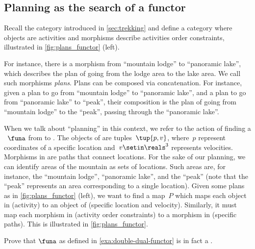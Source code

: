 \subsection{Planning as the search of a functor}

\begin{example}
    \label{ex:planning-as-search-functor}
    Recall the category \Berg introduced in \cref{sec:trekking} and define a category \Plans where objects are activities and morphisms describe activities order constraints, illustrated in \cref{fig:plans_functor} (left).

    For instance, there is a morphism from ``mountain lodge'' to ``panoramic lake'', which describes the plan of going from the lodge area to the lake area.
    We call such morphisms \emph{plans}.
    Plans can be composed via concatenation.
    For instance, given a plan to go from ``mountain lodge'' to ``panoramic lake'', and a plan to go from ``panoramic lake'' to ``peak'', their composition is the plan of going from ``mountain lodge'' to the ``peak'', passing through the ``panoramic lake''.

    When we talk about ``planning'' in this context, we refer to the action of finding a ~$\funa$ from \Plans to \Berg.
    The objects of \Berg are tuples~$\tup{p,v}$, where~$p$ represent coordinates of a specific location and~$v\setin \reals^3$ represents velocities.
    Morphisms in \Berg are paths that connect locations.
    For the sake of our planning, we can identify areas of the mountain as sets of locations.
    Such areas are, for instance, the ``mountain lodge'', ``panoramic lake'', and the
    ``peak'' (note that the ``peak'' represents an area corresponding to a single location).
    Given some plans as in \cref{fig:plans_functor} (left), we want to find a map~$P$ which maps each object in \Plans (activity) to an object of \Berg (specific location and velocity).
    Similarly, it must map each morphism in \Plans (activity order constraints) to a morphism in \Berg (specific paths).
    This is illustrated in \cref{fig:plans_functor}.
\end{example}

\begin{figure*}[h!]
    \centering
    \caption{Planning .}
    \label{fig:plans_functor}
\end{figure*}

\vfill
\clearpage
\vfill

\begin{gradedexercise}
    \label{ex:DoubleDualFunctor}
    Prove that $\funa$ as defined in \cref{exa:double-dual-functor} is in fact a .
\end{gradedexercise}


